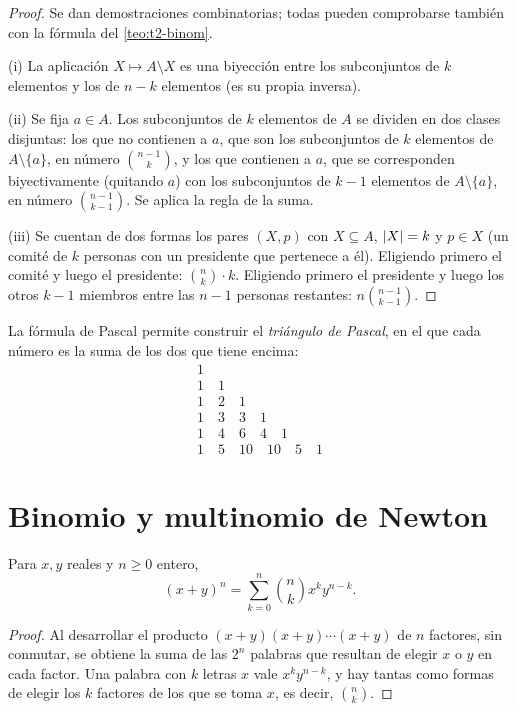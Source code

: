 \begin{proof}
Se dan demostraciones combinatorias; todas pueden comprobarse también con la fórmula del \cref{teo:t2-binom}.

(i) La aplicación $X\mapsto A\setminus X$ es una biyección entre los subconjuntos de $k$ elementos y los de $n-k$ elementos (es su propia inversa).

(ii) Se fija $a\in A$. Los subconjuntos de $k$ elementos de $A$ se dividen en dos clases disjuntas: los que no contienen a $a$, que son los subconjuntos de $k$ elementos de $A\setminus\{a\}$, en número $\binom{n-1}{k}$, y los que contienen a $a$, que se corresponden biyectivamente (quitando $a$) con los subconjuntos de $k-1$ elementos de $A\setminus\{a\}$, en número $\binom{n-1}{k-1}$. Se aplica la regla de la suma.

(iii) Se cuentan de dos formas los pares $(X,p)$ con $X\subseteq A$, $\lvert X\rvert=k$ y $p\in X$ (un comité de $k$ personas con un presidente que pertenece a él). Eligiendo primero el comité y luego el presidente: $\binom{n}{k}\cdot k$. Eligiendo primero el presidente y luego los otros $k-1$ miembros entre las $n-1$ personas restantes: $n\binom{n-1}{k-1}$.
\end{proof}

La fórmula de Pascal permite construir el \emph{triángulo de Pascal}, en el que cada número es la suma de los dos que tiene encima:
\[
\begin{array}{c}
1\\
1\quad 1\\
1\quad 2\quad 1\\
1\quad 3\quad 3\quad 1\\
1\quad 4\quad 6\quad 4\quad 1\\
1\quad 5\quad 10\quad 10\quad 5\quad 1
\end{array}
\]

\section{Binomio y multinomio de Newton}

\begin{teorema}\label{teo:t2-binomio}
Para $x,y$ reales y $n\ge0$ entero,
\[
(x+y)^{n}=\sum_{k=0}^{n}\binom{n}{k}x^{k}y^{n-k}.
\]
\end{teorema}

\begin{proof}
Al desarrollar el producto $(x+y)(x+y)\cdots(x+y)$ de $n$ factores, sin conmutar, se obtiene la suma de las $2^{n}$ palabras que resultan de elegir $x$ o $y$ en cada factor. Una palabra con $k$ letras $x$ vale $x^{k}y^{n-k}$, y hay tantas como formas de elegir los $k$ factores de los que se toma $x$, es decir, $\binom{n}{k}$.
\end{proof}

